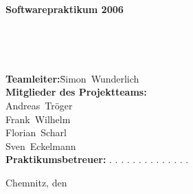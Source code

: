 
\pagestyle{empty}%
{%
	\begin{center}
		\Large \bf{Softwarepraktikum 2006}\\[1.5ex]
	\end{center}
}
\vspace{1.5cm}

{%
	\begin{center}
		\Huge\bf\dctitle
		\\[2.5ex]
	\end{center}
}
\vspace{1.5cm}

{%
	\begin{center}
		\bf\huge\dcsubject\\[1.5ex]
		\dcsubtitle
	\end{center}
}
\vspace{2.0cm}

{%
	\begin{tabbing}
		\hspace{4.5cm}\=\textbf{Teamleiter:}\hspace{0.5cm}\=Simon~Wunderlich\\[2.0ex]
		            \>\textbf{Mitglieder des Projektteams:}\\[1.5ex]
		            \>            \>Andreas~Tröger \\[1.5ex]
		            \>            \>Frank~Wilhelm \\[1.5ex]
		            \>            \>Florian~Scharl \\[1.5ex]
		            \>            \>Sven~Eckelmann \\[4.0ex]
                            \> \textbf{Praktikumsbetreuer:} . . . . . . . . . . . . . .
	\end{tabbing}
}
\vspace{3.0cm}

{%
	Chemnitz, den \dcdate
}

\cleardoublepage
\pagestyle{plain} %
